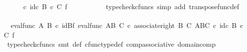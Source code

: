 \begin{isabellebody}
\ \isamarkupfalse%
\ {\isachardoublequoteopen}{\isachardot}{\kern0pt}{\isachardot}{\kern0pt}{\isachardot}{\kern0pt}\ {\isacharequal}{\kern0pt}\ {\isasympsi}\ {\isasymcirc}\isactrlsub c\ {\isacharparenleft}{\kern0pt}id\isactrlsub c\ {\isacharparenleft}{\kern0pt}B\ {\isasymtimes}\isactrlsub c\ C{\isacharparenright}{\kern0pt}\ {\isasymtimes}\isactrlsub f\ {\isasymphi}\isactrlsup {\isasymsharp}\isactrlsup {\isasymsharp}{\isacharparenright}{\kern0pt}{\isachardoublequoteclose}\isanewline
\ \ \ \ \ \ \ \ \isamarkupfalse%
\ {\isacharparenleft}{\kern0pt}typecheck{\isacharunderscore}{\kern0pt}cfuncs{\isacharcomma}{\kern0pt}\ simp\ add{\isacharcolon}{\kern0pt}\ transpose{\isacharunderscore}{\kern0pt}func{\isacharunderscore}{\kern0pt}def{\isacharparenright}{\kern0pt}\isanewline
\ \ \ \ \ \ \isamarkupfalse%
\ \isamarkupfalse%
\ {\isachardoublequoteopen}{\isachardot}{\kern0pt}{\isachardot}{\kern0pt}{\isachardot}{\kern0pt}\ {\isacharequal}{\kern0pt}{\isacharparenleft}{\kern0pt}eval{\isacharunderscore}{\kern0pt}func\ A\ B{\isacharparenright}{\kern0pt}\ {\isasymcirc}\isactrlsub c\ {\isacharparenleft}{\kern0pt}id{\isacharparenleft}{\kern0pt}B{\isacharparenright}{\kern0pt}{\isasymtimes}\isactrlsub f\ eval{\isacharunderscore}{\kern0pt}func\ {\isacharparenleft}{\kern0pt}A\isactrlbsup B\isactrlesup {\isacharparenright}{\kern0pt}\ C{\isacharparenright}{\kern0pt}\ {\isasymcirc}\isactrlsub c\ {\isacharparenleft}{\kern0pt}associate{\isacharunderscore}{\kern0pt}right\ B\ C\ {\isacharparenleft}{\kern0pt}{\isacharparenleft}{\kern0pt}A\isactrlbsup B\isactrlesup {\isacharparenright}{\kern0pt}\isactrlbsup C\isactrlesup {\isacharparenright}{\kern0pt}{\isacharparenright}{\kern0pt}\ {\isasymcirc}\isactrlsub c\ {\isacharparenleft}{\kern0pt}id\isactrlsub c\ {\isacharparenleft}{\kern0pt}B\ {\isasymtimes}\isactrlsub c\ C{\isacharparenright}{\kern0pt}\ {\isasymtimes}\isactrlsub f\ {\isasymphi}\isactrlsup {\isasymsharp}\isactrlsup {\isasymsharp}{\isacharparenright}{\kern0pt}{\isachardoublequoteclose}\isanewline
\ \ \ \ \ \ \ \ \isamarkupfalse%
\ {\isacharparenleft}{\kern0pt}typecheck{\isacharunderscore}{\kern0pt}cfuncs{\isacharcomma}{\kern0pt}\ smt\ {\isasympsi}{\isacharunderscore}{\kern0pt}def\ cfunc{\isacharunderscore}{\kern0pt}type{\isacharunderscore}{\kern0pt}def\ comp{\isacharunderscore}{\kern0pt}associative\ domain{\isacharunderscore}{\kern0pt}comp{\isacharparenright}{\kern0pt}\isanewline
\ \ \ \ \ \ \isamarkupfalse%
\ \isamarkupfalse%

\end{isabellebody}
